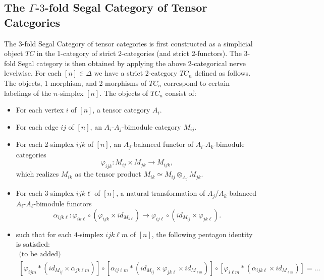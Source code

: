 \documentclass{amsart}
\begin{document}

\subsection{The $\Gamma$-$3$-fold Segal Category of Tensor Categories}


The 3-fold Segal Category of tensor categories is first constructed as a simplicial object $TC$ in the 1-category of strict 2-categories (and strict 2-functors). The 3-fold Segal category is then obtained by applying the above 2-categorical nerve levelwise. For each $[n] \in \Delta$ we have a strict 2-category $TC_n$ defined as follows. The objects, 1-morphism, and 2-morphisms of $TC_n$ correspond to certain labelings of the $n$-simplex $[n]$. The objects of $TC_n$ consist of:
\begin{itemize}
	\item For each vertex $i$ of $[n]$, a tensor category $A_i$. 
	\item For each edge $ij$ of $[n]$, an $A_i$-$A_j$-bimodule category $M_{ij}$.
	\item For each 2-simplex $ijk$ of $[n]$, an $A_j$-balanced functor of $A_i$-$A_k$-bimodule categories 
	\begin{equation*}
		\varphi_{ijk}: M_{ij} \times M_{jk} \to M_{ijk},
	\end{equation*}
	 which realizes $M_{ik}$ as the tensor product $M_{ik} \simeq M_{ij} \otimes_{A_j} M_{jk}$. 
	\item For each 3-simplex $ijk\ell$ of $[n]$, a natural transformation of $A_j$/$A_k$-balanced $A_i$-$A_\ell$-bimodule functors 
	\begin{equation*}
		\alpha_{ijk \ell}: \varphi_{i k \ell} \circ (\varphi_{ijk} \times id_{M_{k\ell}}) \to \varphi_{ij \ell} \circ (id_{M_{ij}} \times \varphi_{jk\ell}).
	\end{equation*}
	\item such that for each $4$-simplex $ijk\ell m$ of $[n]$, the following pentagon identity is satisfied:
	\begin{align*}
		\text{(to be added)}  \\ [\varphi_{ijm} * (id_{M_{ij}} \times \alpha_{jk\ell m})] \circ [\alpha_{ij\ell m} * (id_{M_{ij}} \times \varphi_{jk\ell} \times id_{M_{\ell m}})] \circ [\varphi_{i \ell m} * ( \alpha_{ijk \ell} \times id_{M_{\ell m}})] = ...
	\end{align*} 
\end{itemize}
\end{document}

